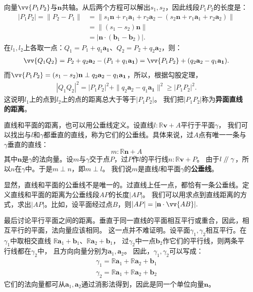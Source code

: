 \documentclass[12pt,UTF8]{ctexbook}
\renewcommand\parallel{\mathrel{/\mskip-4mu/}}
\begin{document}
向量$\vv{P_1P_2}$与$\mathbf{n}$共轴。从后两个方程可以解出$s_1,s_2$，因此线段$P_1P_2$的长度是：
\begin{align*}
    |P_1P_2| = \|P_2 - P_1\| &= \|s_1\mathbf{n} + r_1\mathbf{a}_1 + r_2\mathbf{a}_2 - (s_2\mathbf{n} + r_1\mathbf{a}_1 + r_2\mathbf{a}_2)\|  \\
    &= \| (s_1 - s_2)\mathbf{n} \|  \\
    &= |\mathbf{n}\cdot(\mathbf{b}_1 - \mathbf{b}_2)|. 
\end{align*}
在$l_1,l_2$上各取一点：$Q_1 = P_1 + q_1\mathbf{a_1}$、$Q_2 = P_2 + q_2\mathbf{a}_2$，则：
\begin{align*}
    \vv{Q_1Q_2} = P_2 + q_2\mathbf{a}_2 - (P_1 + q_1\mathbf{a_1}) = \vv{P_1P_2}  + (q_2\mathbf{a}_2 - q_1\mathbf{a_1}).  
\end{align*}
而$\vv{P_1P_2} = (s_1 - s_2)\mathbf{n} \perp q_2\mathbf{a}_2 - q_1\mathbf{a_1}$，所以，根据勾股定理，
\begin{align*}
    |Q_1Q_2|^2 = |P_1P_2|^2 + \|q_2\mathbf{a}_2 - q_1\mathbf{a_1}\|^2 \geqslant |P_1P_2|^2.  
\end{align*}
这说明$l_1$上的点到$l_2$上的点的距离总大于等于$|P_1P_2|$。
我们把$|P_1P_2|$称为\textbf{异面直线的距离}。

直线和平面的距离，也可以用公垂线定义。设直线$l:\mathbb{R}\mathbf{v} + A$平行于平面$\gamma$，
我们可以找出与$l$和$\gamma$都垂直的直线，称为它们的公垂线。具体来说，过$A$点有唯一一条与$\gamma$垂直的直线：
$$ m:\mathbb{R}\mathbf{n} + A $$
其中$\mathbf{n}$是$\gamma$的法向量。设$m$与$\gamma$交于点$P$，过$P$作$l$的平行线$n:\mathbb{R}\mathbf{v} + P$。
由于$l\parallel\gamma$，所以$n$在$\gamma$中。于是$m\perp n$，即$m\perp l$。
我们说$m$是直线$l$和平面$\gamma$的\textbf{公垂线}。

显然，直线和平面的公垂线不是唯一的。过直线上任一点，都恰有一条公垂线。定义直线和平面的距离为公垂线段$AP$的长度$|AP|$。
我们可以用求点到直线距离的方式，求出$|AP|$。比如，设平面经过点$B$，则$|AP| = |\mathbf{n}\cdot \vv{AB}|.$

最后讨论平行平面之间的距离。垂直于同一直线的平面相互平行或重合，因此，相互平行的平面，法向量应该相同。
这一点并不难证明。设平面$\gamma_1,\gamma_2$相互平行。在$\gamma_1$中取相交直线
$\mathbb{R}\mathbf{a}_1 + \mathbf{b}_1$、$\mathbb{R}\mathbf{a}_2 + \mathbf{b}_1$，
过$\gamma_2$中一点$\mathbf{b}_2$作它们的平行线，则两条平行线都在$\gamma_2$中，
且方向向量分别为$\mathbf{a}_1,\mathbf{a}_2$。
因此，$\gamma_1,\gamma_2$可以写成：
\begin{align*}
    \gamma_1 = \mathbb{R}\mathbf{a}_1 + \mathbb{R}\mathbf{a}_2 + \mathbf{b}_1  \\
    \gamma_2 = \mathbb{R}\mathbf{a}_1 + \mathbb{R}\mathbf{a}_2 + \mathbf{b}_2 
\end{align*}
它们的法向量都可从$\mathbf{a}_1,\mathbf{a}_2$通过消影法得到，因此是同一个单位向量$\mathbf{n}$。
\end{document}
